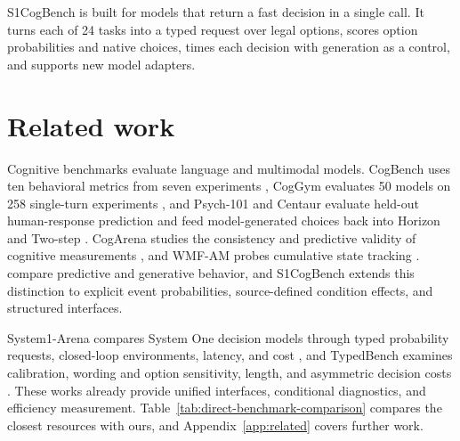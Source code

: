 \documentclass[11pt,a4paper]{article}
\newcommand{\bench}{S1CogBench}
\begin{document}
\bench{} is built for models that return a fast decision in a single call. It turns each of 24 tasks into a typed request over legal options, scores option probabilities and native choices, times each decision with generation as a control, and supports new model adapters.

\section{Related work}
\label{sec:related}
Cognitive benchmarks evaluate language and multimodal models. CogBench uses ten behavioral metrics from seven experiments \citep{codaforno2024cogbench}, CogGym evaluates 50 models on 258 single-turn experiments \citep{ying2026coggym}, and Psych-101 and Centaur evaluate held-out human-response prediction and feed model-generated choices back into Horizon and Two-step \citep{binz2025centaur}. CogArena studies the consistency and predictive validity of cognitive measurements \citep{hou2026cogarena}, and WMF-AM probes cumulative state tracking \citep{hou2026wmfam}. \citet{namazova2025centaur} compare predictive and generative behavior, and \bench{} extends this distinction to explicit event probabilities, source-defined condition effects, and structured interfaces.

System1-Arena compares System One decision models through typed probability requests, closed-loop environments, latency, and cost \citep{chen2026system1arena}, and TypedBench examines calibration, wording and option sensitivity, length, and asymmetric decision costs \citep{sharma2026typedbench}. These works already provide unified interfaces, conditional diagnostics, and efficiency measurement. Table~\ref{tab:direct-benchmark-comparison} compares the closest resources with ours, and Appendix~\ref{app:related} covers further work.
\end{document}
